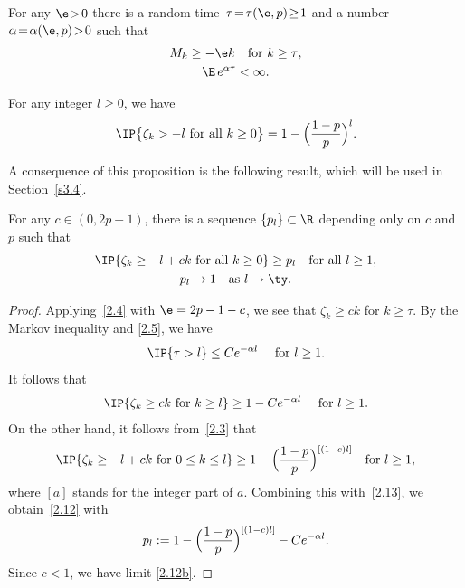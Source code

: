 \skpt
\begin{proposition} \label{p2.1}
\begin{enumeratea}
\item
For any $\e\!>\!0$ there is a random time~$\tau\!=\!\tau(\e,p)\!\ge\!1$ and a number \hbox{$\alpha\!=\!\alpha(\e,p)\!>\!0$} such that
\begin{gather}
M_k\ge -\e k\quad\text{for $k\ge\tau$},\label{2.4}\\
\E \,e^{\alpha\tau}<\infty. \label{2.5}
\end{gather}

\item
For any integer $l\ge0$, we have
\begin{equation}\label{2.3}
\IP\bigl\{\zeta_k> -l\text{ for all }k\ge0\bigr\}=1-\Bigl(\dfrac{1-p}{p}\Bigr)^l.
\end{equation}
\end{enumeratea}
\end{proposition}

A consequence of this proposition is the following result, which will be used in Section~\ref{s3.4}.

\begin{corollary} \label{c2.2}
For any $c\in(0,2p-1)$, there is a sequence $\{p_l\}\subset \R$ depending only on $c$ and $p$ such that
\begin{gather}
\IP\{\zeta_k\ge -l+ck\text{ for all $k\ge0$}\}\ge p_l \quad \text{for all $l\ge1$},\label{2.12}\\
p_l\to 1 \quad \text{as $l\to \ty$}. \label{2.12b}
\end{gather}
\end{corollary}
\begin{proof}
Applying~\eqref{2.4} with $\e=2p-1-c$, we see that $\zeta_k\ge ck$ for $k\ge \tau$.
By the Markov inequality and \eqref{2.5}, we have
\[
\IP\{\tau>l\}\le C e^{-\alpha l} \quad\text{ for $l\ge1$}.
\]
It follows that
\begin{equation} \label{2.13}
\IP\{\zeta_k\ge ck\text{ for $k\ge l$}\}\ge 1-C e^{-\alpha l}\quad\text{ for $l\ge1$}.
\end{equation}
On the other hand, it follows from~\eqref{2.3} that
\[
\IP\{\zeta_k\ge -l+ck\text{ for $0\le k\le l$}\}\ge1- \Bigl(\dfrac{1-p}{p}\Bigr)^{[(1-c)l]}
\quad \text{for $l\ge1$},
\]
where $[a]$ stands for the integer part of $a$. Combining this with~\eqref{2.13}, we obtain~\eqref{2.12} with
\[
p_l:=1- \Bigl(\dfrac{1-p}{p}\Bigr)^{[(1-c)l]} -C e^{-\alpha l}.
\]
Since $c<1$, we have limit \eqref{2.12b}.
\end{proof}


